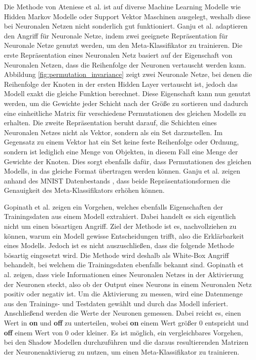 Die Methode von Ateniese et al. \cite{P-80} ist auf diverse Machine Learning Modelle wie Hidden Markov Modelle oder Support Vektor Maschinen ausgelegt, weshalb diese bei Neuronalen Netzen nicht sonderlich gut funktioniert. 
Ganju et al. \cite{P-11} adaptieren den Angriff für Neuronale Netze, indem zwei geeignete Repräsentation für Neuronale Netze genutzt werden, um den Meta-Klassifikator zu trainieren.
Die erste Repräsentation eines Neuronalen Netz basiert auf der Eigenschaft von Neuronalen Netzen, dass die Reihenfolge der Neuronen vertauscht werden kann. 
Abbildung \ref{fig:permutation_invariance} zeigt zwei Neuronale Netze, bei denen die Reihenfolge der Knoten in der ersten Hidden Layer vertauscht ist, jedoch das Modell exakt die gleiche Funktion berechnet.
Diese Eigenschaft kann nun genutzt werden, um die Gewichte jeder Schicht nach der Größe zu sortieren und dadurch eine einheitliche Matrix für verschiedene Permutationen des gleichen Modells zu erhalten.
Die zweite Repräsentation beruht darauf, die Schichten eines Neuronalen Netzes nicht als Vektor, sondern als ein Set darzustellen.
Im Gegensatz zu einem Vektor hat ein Set keine feste Reihenfolge oder Ordnung, sondern ist lediglich eine Menge von Objekten, in diesem Fall eine Menge der Gewichte der Knoten.
Dies sorgt ebenfalls dafür, dass Permutationen des gleichen Modells, in das gleiche Format übertragen werden können.
Ganju et al. \cite{P-11} zeigen anhand des MNIST Datenbestands \cite{D-MNIST}, dass beide Repräsentationsformen die Genauigkeit des Meta-Klassifikators erhöhen können.


Gopinath et al. \cite{P-12} zeigen ein Vorgehen, welches ebenfalls Eigenschaften der Trainingsdaten aus einem Modell extrahiert. 
Dabei handelt es sich eigentlich nicht um einen bösartigen Angriff.
Ziel der Methode ist es, nachvollziehen zu können, warum ein Modell gewisse Entscheidungen trifft, also die Erklärbarkeit eines Modells.
Jedoch ist es nicht auszuschließen, dass die folgende Methode bösartig eingesetzt wird.
Die Methode wird deshalb als White-Box Angriff behandelt, bei welchem die Trainingsdaten ebenfalls bekannt sind.
Gopinath et al. \cite{P-12} zeigen, dass viele Informationen eines Neuronalen Netzes in der Aktivierung der Neuronen steckt, also ob der Output eines Neurons in einem Neuronalen Netz positiv oder negativ ist.
Um die Aktivierung zu messen, wird eine Datenmenge aus den Trainings- und Testdaten gewählt und durch das Modell inferiert.
Anschließend werden die Werte der Neuronen gemessen.
Dabei reicht es, einen Wert in \textbf{on} und \textbf{off} zu unterteilen, wobei \textbf{on} einem Wert größer 0 entspricht und \textbf{off} einem Wert von 0 oder kleiner.
Es ist möglich, ein vergleichbares Vorgehen, bei den Shadow Modellen durchzuführen und die daraus resultierenden Matrizen der Neuronenaktivierug zu nutzen, um einen Meta-Klassifikator zu trainieren.
